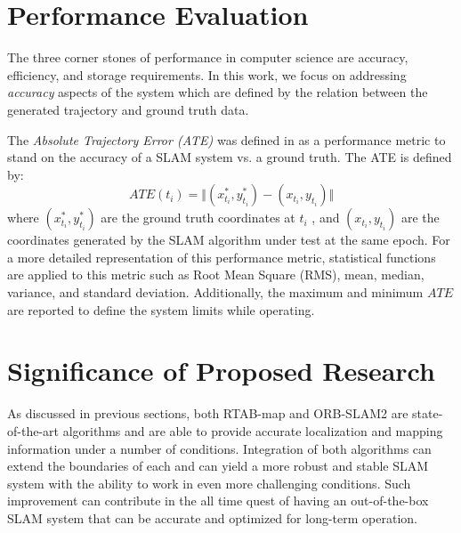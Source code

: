 \documentclass[12pt]{article}
\begin{document}
\section{Performance Evaluation}
The three corner stones of performance in computer science are accuracy, efficiency, and storage requirements. In this work, we focus on addressing \textit{accuracy} aspects of the system which are defined by the relation between the generated trajectory and ground truth data. 

The \textit{Absolute Trajectory Error (ATE)} was defined in \cite{8710464} as a performance metric to stand on the accuracy of a SLAM system vs. a ground truth. The ATE is defined by:
\begin{equation}
ATE(t_i) = \Vert (x_{t_i}^*,y_{t_i}^*) - (x_{t_i},y_{t_i}) \Vert
\end{equation}
where $(x_{t_i}^*,y_{t_i}^*)$ are the ground truth coordinates at $t_i$ , and $(x_{t_i},y_{t_i})$ are the coordinates generated by the SLAM algorithm under test at the same epoch. For a more detailed representation of this performance metric, statistical functions are applied to this metric such as Root Mean Square (RMS), mean, median, variance, and standard deviation. Additionally, the maximum and minimum $ATE$ are reported to define the system limits while operating. 
\section{Significance of Proposed Research}
As discussed in previous sections, both RTAB-map and ORB-SLAM2 are state-of-the-art algorithms and are able to provide accurate localization and mapping information under a number of conditions. Integration of both algorithms can extend the boundaries of each and can yield a more robust and stable SLAM system with the ability to work in even more challenging conditions. Such improvement can contribute in the all time quest of having an out-of-the-box SLAM system \cite{cadena2016past} that can be accurate and optimized for long-term operation.

\newpage


 
\end{document}
